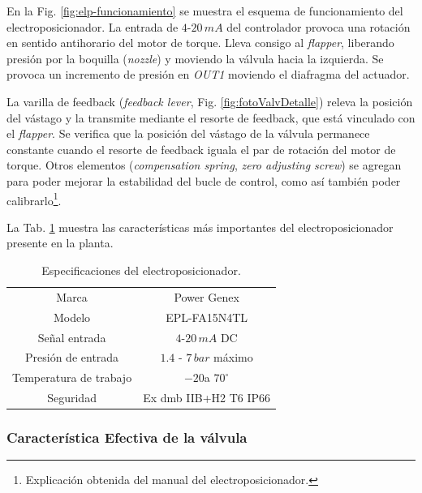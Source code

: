 En la Fig. \ref{fig:elp-funcionamiento} se muestra el esquema de
funcionamiento del electroposicionador.
La entrada de $4$-$20\,mA$ del controlador provoca una rotación en sentido
antihorario del motor de torque.
Lleva consigo al \emph{flapper}, liberando
presión por la boquilla (\emph{nozzle}) y moviendo la válvula hacia la
izquierda.
Se provoca un incremento de presión en \emph{OUT1} moviendo el diafragma del
actuador.

La varilla de feedback (\emph{feedback lever}, Fig. \ref{fig:fotoValvDetalle})
releva la posición del vástago y
la transmite mediante el resorte de feedback, que está vinculado con el
\emph{flapper}.
Se verifica que la posición del vástago de la válvula permanece constante
cuando el resorte de feedback iguala el par de rotación del motor de torque.
Otros elementos (\emph{compensation spring}, \emph{zero adjusting screw}) se
agregan para poder mejorar la estabilidad del bucle de control, como así
también poder calibrarlo\footnote{Explicación obtenida del manual del
electroposicionador.}.

La Tab. \ref{tab:especifElectroP} muestra las características más importantes
del electroposicionador presente en la planta.

\begin{table}[ht]
\renewcommand{\arraystretch}{1.3}
 \centering
 \begin{tabular}{|c|c|}
  \hline
  Marca & Power Genex\\
  Modelo & EPL-FA15N4TL\\
  Señal entrada & $4$-$20\,mA$ DC\\
  Presión de entrada & $1.4$ - $7\,bar$ máximo\\
  Temperatura de trabajo & $-20$a $70^\circ$\\
  Seguridad & Ex dmb IIB+H2 T6 IP66\\
  \hline
 \end{tabular}
 \caption{Especificaciones del electroposicionador.}
 \label{tab:especifElectroP}
\end{table}

\subsubsection{Característica Efectiva de la válvula}

